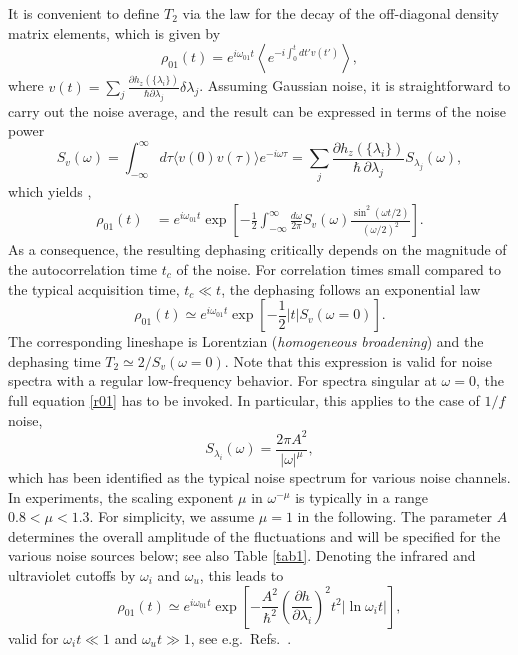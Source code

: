 \documentclass[twocolumn,amsmath,amssymb,floatfix,pra,showpacs,eqsecnum,footinbib,superscriptaddress]{revtex4}
\newcommand{\abs}[1]{\left|#1\right|}
\newcommand{\be}{\begin{equation}}
\newcommand{\ee}{\end{equation}}
\begin{document}
It is convenient to define $T_2$ via the law for the decay of the off-diagonal density matrix elements, which is given by
\be
\rho_{01}(t)=e^{i\omega_{01}t}\left\langle e^{ -i \int_0^t dt' v(t') } \right\rangle,
\ee
where $v(t)=\sum_j \frac{\partial h_z(\{\lambda_i\})}{\hbar \partial \lambda_j}\delta\lambda_j$. Assuming Gaussian noise, it is straightforward to carry out the noise average, and the result can be expressed in terms of the noise power 
\be
S_v(\omega)=\int_{-\infty}^\infty d\tau \langle v(0)v(\tau) \rangle e^{-i\omega \tau}=\sum_j \frac{\partial h_z(\{\lambda_i\})}{\hbar \,\partial \lambda_j}S_{\lambda_j}(\omega),
\ee
which yields \cite{makhlin2,ithier},
\begin{align}%
\rho_{01}(t)%
&=e^{i\omega_{01}t}\exp\left[ -\frac{1}{2}\int_{-\infty}^\infty \frac{d\omega}{2\pi} S_v(\omega)\frac{\sin^2(\omega t/2)}{(\omega/2)^2}\right].\label{r01}
\end{align}
As a consequence, the resulting dephasing critically depends on the magnitude of the autocorrelation time $t_c$ of the noise. For correlation times small compared to the typical acquisition time, $t_c\ll t$, the dephasing follows an exponential law
\be
\rho_{01}(t)\simeq e^{i\omega_{01}t}\exp\left[-\frac{1}{2}\abs{t}S_v(\omega=0)\right].
\ee
The corresponding lineshape is Lorentzian (\emph{homogeneous broadening}) and the dephasing time $T_2\simeq 2/S_v(\omega=0)$. Note that this expression is valid for noise spectra with a regular low-frequency behavior. For spectra singular at $\omega=0$, the full equation \eqref{r01} has to be invoked. In particular, this applies to the case of $1/f$ noise,
\be
S_{\lambda_i}(\omega)=\frac{2\pi A^2}{\abs{\omega}^\mu},
\ee
 which has been identified as the typical noise spectrum for various noise channels. In experiments, the scaling exponent $\mu$ in $\omega^{-\mu}$ is typically in a range $0.8<\mu<1.3$. For simplicity, we assume $\mu=1$ in the following. The parameter $A$ determines the overall amplitude of the fluctuations and will be specified for the various noise sources below; see also Table \ref{tab1}. Denoting the 
 infrared and ultraviolet cutoffs by $\omega_i$ and $\omega_u$,  this leads to 
\be
\rho_{01}(t)\simeq e^{i\omega_{01}t}\exp\left[-\frac{A^2}{\hbar^2}\left(\frac{\partial h}{\partial \lambda_i}\right)^2 t^2 \abs{\ln \omega_i t}\right],\label{decaylaw}
\ee
valid for $\omega_i t \ll 1$ and $\omega_u t\gg1$, see e.g.\ Refs.\ \cite{ithier,cottet3,makhlin2}. 
\end{document}
